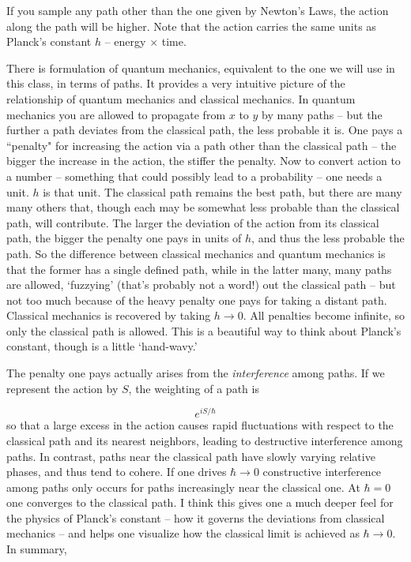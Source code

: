 If you sample any path other than the one given by Newton's Laws, the action
along the path will be higher. Note that the action carries the same units as
Planck's constant $h$ -- energy $\times$ time. 

There is formulation of quantum mechanics, equivalent to the one we will use in this class, in
terms of paths. It provides a very intuitive picture of the relationship of quantum mechanics and
classical mechanics. In quantum mechanics you are allowed to propagate from $x$
to $y$ by many paths -- but the further a path deviates from the classical path, the less probable it is. 
One pays a ``penalty" for increasing the action via a path other than the
classical path -- the bigger the increase in the action, the stiffer the
penalty. Now to convert action to a number -- something that could
possibly lead to a probability -- one needs a unit. $h$ is that unit. The classical path remains the
best path, but there are many many others that, though each may be somewhat less probable than
the classical path, will contribute. The larger the deviation of the action from its classical path,
the bigger the penalty one pays in units of $h$, and thus the less probable the path. So the difference
between classical mechanics and quantum mechanics is that the former has a single defined path,
while in the latter many, many paths are allowed, `fuzzying' (that’s probably not a word!) out
the classical path -- but not too much because of the heavy penalty one pays for taking a distant
path. Classical mechanics is recovered by taking $h \rightarrow 0$. All
penalties become infinite, so only the classical path is allowed.  This is
a beautiful way to think about Planck's constant, though is a little
`hand-wavy.'

The penalty one pays actually arises from the \textit{interference} among
paths. If we represent the action by $S$, the weighting of a path is 

\[
  e^{iS/\hbar}
\] \vspace{3px}
so that a large excess in the action causes rapid fluctuations with respect to the classical path and
its nearest neighbors, leading to destructive interference among paths. In
contrast, paths near the classical path have slowly varying relative phases, and thus tend to cohere. 
If one drives $\hbar \rightarrow 0$ constructive interference among paths only
occurs for paths increasingly near the classical one. At $\hbar = 0$ one converges to the classical path.
I think this gives one a much deeper feel for the physics of Planck’s constant
-- how it governs the deviations from classical mechanics – and helps one
visualize how the classical limit is achieved as $\hbar \rightarrow 0$. In
summary, 

